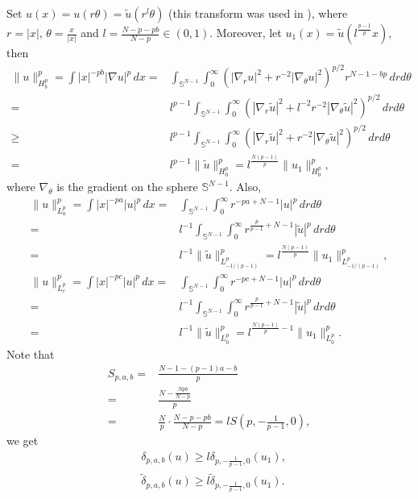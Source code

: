 \documentclass[11pt]{article}
\numberwithin{equation}{section}
\begin{document}
Set $u(x) = u(r\theta) = \tilde{u}(r^l\theta)$ (this transform was used in \cite{Toshio1997, Lam2017}), where $r=|x|,\, \theta = \frac{x}{|x|}$ and $l=\frac{N-p-pb}{N-p}\in (0,1)$. Moreover, let $u_1(x) = \tilde{u}(l^{\frac{p-1}{p}}x)$, then
\begin{align*}
    \|u\|_{H^p_b}^p = \int |x|^{-pb}|\nabla u|^p\,dx ={}& \int_{\mathbb{S}^{N-1}}\int_0^\infty (|\nabla_ru|^2+r^{-2}|\nabla_\theta u|^2)^{p/2}r^{N-1-bp}\,drd\theta \\
    ={}& l^{p-1}\int_{\mathbb{S}^{N-1}}\int_0^\infty (|\nabla_r\tilde{u}|^2+l^{-2}r^{-2}|\nabla_\theta \tilde{u}|^2)^{p/2}\,drd\theta \\
    \ge{}& l^{p-1}\int_{\mathbb{S}^{N-1}}\int_0^\infty (|\nabla_r\tilde{u}|^2+r^{-2}|\nabla_\theta \tilde{u}|^2)^{p/2}\,drd\theta\\
    ={}& l^{p-1}\|\tilde{u}\|_{H_0^p}^p = l^{\frac{N(p-1)}{p}}\|u_1\|_{H^p_0}^p,
\end{align*}
where $\nabla_\theta$ is the gradient on the sphere $\mathbb{S}^{N-1}$. Also,
\begin{align*}
    \|u\|_{L^p_a}^p =\int |x|^{-pa}|u|^p\,dx ={}& \int_{\mathbb{S}^{N-1}}\int_0^\infty r^{-pa+N-1}|u|^p\,drd\theta\\
    ={}& l^{-1}\int_{\mathbb{S}^{N-1}}\int_0^\infty r^{\frac{p}{p-1}+N-1}|\tilde{u}|^p\,drd\theta\\
    ={}& l^{-1}\|\tilde{u}\|_{L^p_{-1/(p-1)}}^p = l^{\frac{N(p-1)}{p}}\|u_1\|_{L^p_{-1/(p-1)}}^p,\\
    \|u\|_{L^p_c}^p =\int |x|^{-pc}|u|^p\,dx ={}& \int_{\mathbb{S}^{N-1}}\int_0^\infty r^{-pc+N-1}|u|^p\,drd\theta\\
    ={}& l^{-1}\int_{\mathbb{S}^{N-1}}\int_0^\infty r^{\frac{p}{p-1}+N-1}|\tilde{u}|^p\,drd\theta\\
    ={}& l^{-1}\|\tilde{u}\|_{L^p_0}^p = l^{\frac{N(p-1)}{p}-1}\|u_1\|_{L^p_0}^p.
\end{align*}
Note that
\begin{align*}
    S_{p,a,b} ={}& \frac{N-1-(p-1)a-b}{p}\\ ={}& \frac{N-\frac{Npb}{N-p}}{p}\\
    ={}& \frac{N}{p}\cdot \frac{N-p-pb}{N-p} = lS(p,-\frac{1}{p-1},0),
\end{align*}
we get
\begin{equation}
    \begin{aligned}
        & \delta_{p,a,b}(u) \ge l\delta_{p,-\frac{1}{p-1},0}(u_1), \\
        & \tilde{\delta}_{p,a,b}(u) \ge l \tilde{\delta}_{p,-\frac{1}{p-1},0}(u_1).
    \end{aligned}
\end{equation}
\end{document}

